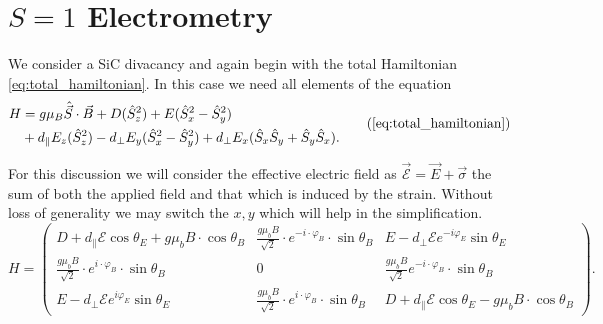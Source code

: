 \section{$S = 1$ Electrometry}

We consider a SiC divacancy and again begin with the total Hamiltonian \eqref{eq:total_hamiltonian}. In this case we need all elements of the equation
\begin{equation}
	\begin{align}
		H & = g \mu_B \hat{\vec{S}}\cdot \vec{B} +
		D(\hat{S}_z^2)  + E(\hat{S}_x^2 - \hat{S}_y^2) \\
		  & +d_\parallel E_z (\hat{S}_z^2)
		- d_\perp  E_y(\hat{S}_x^2 - \hat{S}_y^2   ) + d_\perp E_x(\hat{S}_x\hat{S}_y + \hat{S}_y\hat{S}_x).
	\end{align}
	\tag{\ref{eq:total_hamiltonian}}
\end{equation}

For this discussion we will consider the effective electric field as  $\vec{\mathcal{E}} = \vec{E} + \vec{\sigma} $ the sum of both the applied field and that which is induced by the strain.
Without loss of generality we may switch the $x, y$ which will help in the simplification.
\begin{equation}
	H = \begin{pmatrix}
		D + d_\parallel \mathcal{E}\cos\theta_E + g\mu_b B \cdot \cos \theta_B   & \frac{g\mu_b B}{\sqrt{2}} \cdot e^{-i\cdot \varphi_B} \cdot \sin\theta_B & E - d_\perp \mathcal{E} e^{-i \varphi_E}\sin\theta_E                  \\
		\frac{g\mu_b B}{\sqrt{2}} \cdot e^{i \cdot \varphi_B} \cdot \sin\theta_B & 0                                                                        & \frac{g\mu_b B}{\sqrt{2}} e^{-i\cdot \varphi_B} \cdot \sin\theta_B    \\
		E - d_\perp\mathcal{E}e^{i \varphi_E}\sin\theta_E                        & \frac{g\mu_b B}{\sqrt{2}} \cdot e^{i \cdot \varphi_B} \cdot \sin\theta_B & D+ d_\parallel \mathcal{E}\cos\theta_E - g\mu_b B \cdot \cos \theta_B
	\end{pmatrix}.
	\label{eq:electometry_matrix_hamiltonian}
\end{equation}

